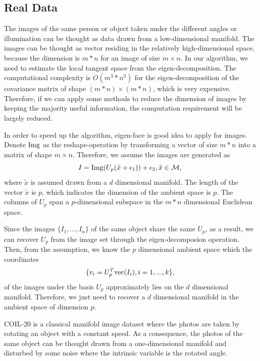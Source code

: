 \documentclass{article}
\theoremstyle{remark}
\begin{document}
\subsection{Real Data}
The images of the same person or object taken under the different angles or illumination can be thought as data drawn from a low-dimensional manifold. The images can be thought as vector residing in the relatively high-dimensional space, because the dimension is $m*n$ for an image of size $m\times n$. In our algorithm, we need to estimate the local tangent space from the eigen-decomposition. The computational complexity is $O(m^3*n^3)$ for the eigen-decomposition of the covariance matrix of shape $(m*n)\times (m*n)$, which is very expensive.
Therefore, if we can apply some methods to reduce the dimension of images by keeping the majority useful information, the computation requirement will be largely reduced.

In order to speed up the algorithm, eigen-face is good idea to apply for images. Denote ${\rm Img}$ as the reshape-operation by transforming a vector of size $m*n$ into a matrix of shape $m\times n$. Therefore, we assume the images are generated as
\[
I = {\rm Img} (U_{p}(\tilde{x}+\epsilon_1))+\epsilon_2, \tilde{x}\in \cal M,
\]
where $\tilde{x}$ is assumed drawn from a $d$ dimensional manifold. The length of the vector $\tilde{x}$ is $p$, which indicates the dimension of the ambient space is $p$. The columns of $U_p$ span a $p$-dimensional subspace in the $m*n$ dimensional Euclidean space. 

Since the images $\{I_1,...,I_n\}$ of the same object share the same $U_p$, as a result, we can recover $U_p$ from the image set through the eigen-decomposion operation.  Then, from the assumption, we know the $p$ dimensional ambient space which the coordinates 
\[
\{v_i = U_p^T {\rm vec}(I_i), i = 1,...,k\},
\]
of the images under the basis $U_p$ approximately lies on the $d$ dimensional manifold. Therefore, we just need to recover a $d$ dimensional manifold in the ambient space of dimension $p$.

COIL-20 \cite{COIL-20} is a classical manifold image dataset where the photos are taken by rotating an object with a constant speed. As a consequence, the photos of the same object can be thought drawn from a one-dimensional manifold and disturbed by some noise where the intrinsic variable is the rotated angle.
\end{document}
